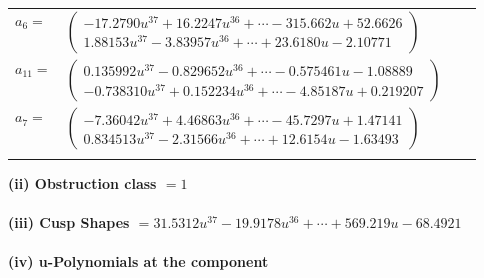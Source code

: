 \documentclass[1p]{elsarticle_modified}
\theoremstyle{definition}
\begin{document}
\begin{tabular}{m{7pt} m{180pt} m{7pt} m{180pt} }
\flushright $a_{6}=$&$\begin{pmatrix}-17.2790 u^{37}+16.2247 u^{36}+\cdots-315.662 u+52.6626\\1.88153 u^{37}-3.83957 u^{36}+\cdots+23.6180 u-2.10771\end{pmatrix}$ \\
\flushright $a_{11}=$&$\begin{pmatrix}0.135992 u^{37}-0.829652 u^{36}+\cdots-0.575461 u-1.08889\\-0.738310 u^{37}+0.152234 u^{36}+\cdots-4.85187 u+0.219207\end{pmatrix}$ \\
\flushright $a_{7}=$&$\begin{pmatrix}-7.36042 u^{37}+4.46863 u^{36}+\cdots-45.7297 u+1.47141\\0.834513 u^{37}-2.31566 u^{36}+\cdots+12.6154 u-1.63493\end{pmatrix}$\\&\end{tabular}
\flushleft \textbf{(ii) Obstruction class $= 1$}\\~\\
\flushleft \textbf{(iii) Cusp Shapes $= 31.5312 u^{37}-19.9178 u^{36}+\cdots+569.219 u-68.4921$}\\~\\
\newpage\renewcommand{\arraystretch}{1}
\flushleft \textbf{(iv) u-Polynomials at the component}\newline \\
\end{document}
